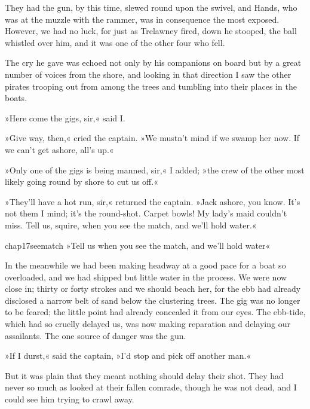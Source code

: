 They had the gun, by this time, slewed round upon the swivel, and Hands, who was at the muzzle with the rammer, was in consequence the most exposed. However, we had no luck, for just as Trelawney fired, down he stooped, the ball whistled over him, and it was one of the other four who fell.

The cry he gave was echoed not only by his companions on board but by a great number of voices from the shore, and looking in that direction I saw the other pirates trooping out from among the trees and tumbling into their places in the boats.

»Here come the gigs, sir,« said I.

»Give way, then,« cried the captain. »We mustn't mind if we swamp her now. If we can't get ashore, all's up.«

»Only one of the gigs is being manned, sir,« I added; »the crew of the other most likely going round by shore to cut us off.«

»They'll have a hot run, sir,« returned the captain. »Jack ashore, you know. It's not them I mind; it's the round-shot. Carpet bowls! My lady's maid couldn't miss. Tell us, squire, when you see the match, and we'll hold water.«



\begin{bwbigpic}
	[\picsize]
	{chap17seematch}
	{»Tell us when you see the match, and we'll hold water«}
\end{bwbigpic}

In the meanwhile we had been making headway at a good pace for a boat so overloaded, and we had shipped but little water in the process. We were now close in; thirty or forty strokes and we should beach her, for the ebb had already disclosed a narrow belt of sand below the clustering trees. The gig was no longer to be feared; the little point had already concealed it from our eyes. The ebb-tide, which had so cruelly delayed us, was now making reparation and delaying our assailants. The one source of danger was the gun.

»If I durst,« said the captain, »I'd stop and pick off another man.«

But it was plain that they meant nothing should delay their shot. They had never so much as looked at their fallen comrade, though he was not dead, and I could see him trying to crawl away.

